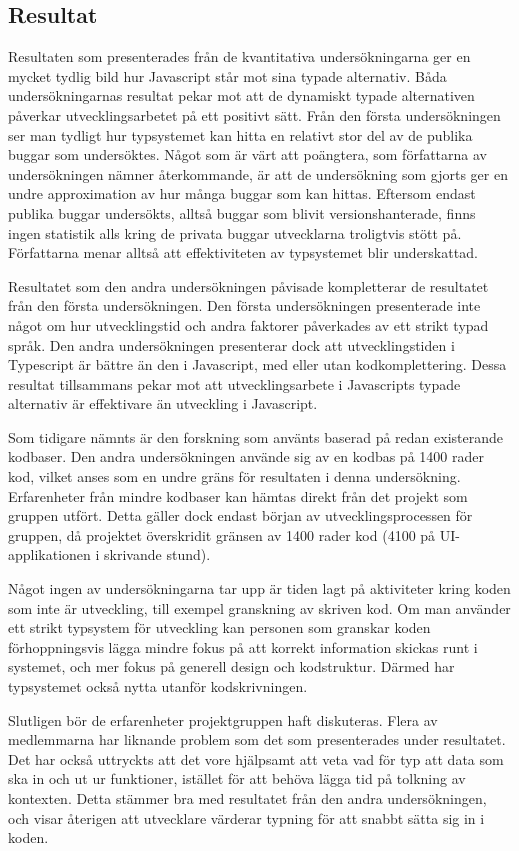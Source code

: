 \subsection{Resultat}
\label{subsec:alexander-discussion-results}

Resultaten som presenterades från de kvantitativa undersökningarna ger en mycket tydlig bild hur Javascript står mot sina typade alternativ. Båda undersökningarnas resultat pekar mot att de dynamiskt typade alternativen påverkar utvecklingsarbetet på ett positivt sätt. Från den första undersökningen ser man tydligt hur typsystemet kan hitta en relativt stor del av de publika buggar som undersöktes. Något som är värt att poängtera, som författarna av undersökningen nämner återkommande, är att de undersökning som gjorts ger en undre approximation av hur många buggar som kan hittas. Eftersom endast publika buggar undersökts, alltså buggar som blivit versionshanterade, finns ingen statistik alls kring de privata buggar utvecklarna troligtvis stött på. Författarna menar alltså att effektiviteten av typsystemet blir underskattad.

Resultatet som den andra undersökningen påvisade kompletterar de resultatet från den första undersökningen.  Den första undersökningen presenterade inte något om hur utvecklingstid och andra faktorer påverkades av ett strikt typad språk. Den andra undersökningen presenterar dock att utvecklingstiden i Typescript är bättre än den i Javascript, med eller utan kodkomplettering. Dessa resultat tillsammans pekar mot att utvecklingsarbete i Javascripts typade alternativ är effektivare än utveckling i Javascript. 

Som tidigare nämnts är den forskning som använts baserad på redan existerande kodbaser. Den andra undersökningen använde sig av en kodbas på 1400 rader kod, vilket anses som en undre gräns för resultaten i denna undersökning. Erfarenheter från mindre kodbaser kan hämtas direkt från det projekt som gruppen utfört. Detta gäller dock endast början av utvecklingsprocessen för gruppen, då projektet överskridit gränsen av 1400 rader kod (4100 på UI-applikationen i skrivande stund).

Något ingen av undersökningarna tar upp är tiden lagt på aktiviteter kring koden som inte är utveckling, till exempel granskning av skriven kod. Om man använder ett strikt typsystem för utveckling kan personen som granskar koden förhoppningsvis lägga mindre fokus på att korrekt information skickas runt i systemet, och mer fokus på generell design och kodstruktur. Därmed har typsystemet också nytta utanför kodskrivningen.

Slutligen bör de erfarenheter projektgruppen haft diskuteras. Flera av medlemmarna har liknande problem som det som presenterades under resultatet. Det har också uttryckts att det vore hjälpsamt att veta vad för typ att data som ska in och ut ur funktioner, istället för att behöva lägga tid på tolkning av kontexten. Detta stämmer bra med resultatet från den andra undersökningen, och visar återigen att utvecklare värderar typning för att snabbt sätta sig in i koden. 

\pagebreak